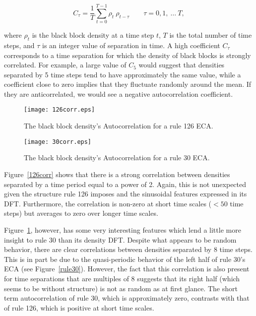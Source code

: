 \begin{equation}
    C_\tau = \frac{1}{T}\sum_{t=0}^{T-1} \rho_t \ \rho_{t-\tau} \qquad
    \tau = 0, 1,\ \ldots\ T,
\end{equation}

\noindent where $\rho_t$ is the black block density at a time step
$t$, $T$ is the total number of time steps, and $\tau$ is an integer
value of separation in time.
A high coefficient $C_\tau$ corresponds to a time separation for which
the density of black blocks is strongly correlated.
For example, a large value of $C_5$ would suggest that densities
separated by 5 time steps tend to have approximately the same value,
while a coefficient close to zero implies that they fluctuate randomly
around the mean.
If they are anticorrelated, we would see a negative autocorrelation
coefficient.

\begin{figure}
    \begin{minipage}[b]{0.49\textwidth}
        \centering
        \texttt{[image: 126corr.eps]}
        \caption{\label{126corr} The black block density's
        Autocorrelation for a rule 126 ECA.}
    \end{minipage}
    \hspace{0.5cm}
    \begin{minipage}[b]{0.49\textwidth}
        \centering
        \texttt{[image: 30corr.eps]}
        \caption{\label{30corr} The black block density's
        Autocorrelation for a rule 30 ECA.}
    \end{minipage}
\end{figure}

Figure~\ref{126corr} shows that there is a strong correlation between
densities separated by a time period equal to a power of 2.
Again, this is not unexpected given the structure rule 126 imposes and
the sinusoidal features expressed in its DFT.
Furthermore, the correlation is non-zero at short time scales ($<50$ time steps) 
but averages to zero over longer time scales.  



Figure~\ref{30corr}, however, has some very interesting features which
lend a little more insight to rule 30 than its density DFT.
Despite what appears to be random behavior, there are clear correlations
between densities separated by 8 time steps.
This is in part be due to the quasi-periodic behavior of the left
half of rule 30's ECA (see Figure~\ref{rule30}).
However, the fact that this correlation is also present for time
separations that are multiples of 8 suggests that its right half
(which seems to be without structure) is not as random as at first
glance.
The short term autocorrelation of rule 30, which is approximately zero,
contrasts with that of rule 126, which is positive at short time scales.
